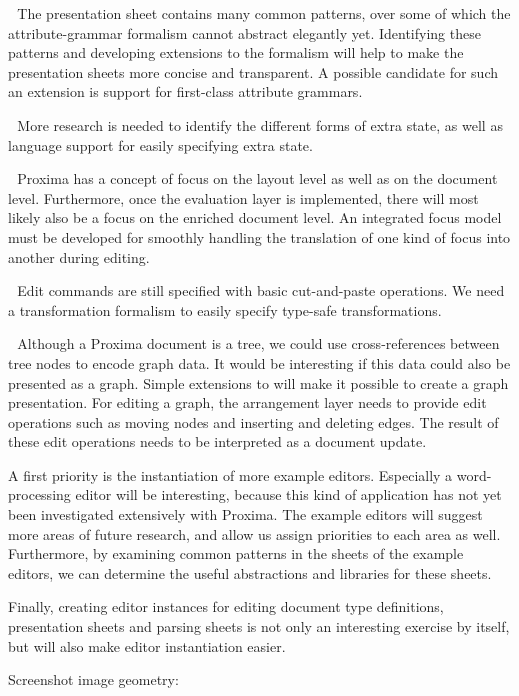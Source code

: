 ~\,The presentation sheet contains many common patterns, over some of which the attribute-grammar formalism cannot abstract elegantly yet. Identifying these patterns and developing extensions to the formalism will help  to make the presentation sheets more concise and transparent. A possible candidate for such an extension is support for first-class attribute grammars.

~\,More research is needed to identify the different forms of extra state, as well as language support for easily specifying extra state.

~\,Proxima has a concept of focus on the layout level as well as on the document level. Furthermore, once the evaluation layer is implemented, there will most likely also be a focus on the enriched document level. An integrated focus model must be developed for smoothly handling the translation of one kind of focus into another during editing.

~\,Edit commands are still specified with basic cut-and-paste operations. We need a transformation formalism to easily specify type-safe transformations.

~\,Although a Proxima document is a tree, we could use cross-references between tree nodes to encode graph data. It would be interesting if this data could also be presented as a graph. Simple extensions to {\Xprez} will make it possible to create a graph presentation. For editing a graph, the arrangement layer needs to provide edit operations such as moving nodes and inserting and deleting edges. The result of these edit operations needs to be interpreted as a document update.

\bigskip
A first priority is the instantiation of more example editors. Especially a word-processing editor will be interesting, because this kind of application has not yet been investigated extensively with Proxima. The example editors will suggest more areas of future research, and allow us assign priorities to each area as well. Furthermore, by examining common patterns in the sheets of the example editors, we can determine the useful abstractions and libraries for these sheets.

Finally, creating editor instances for editing document type definitions, presentation sheets and parsing sheets is not only an interesting exercise by itself, but will also make editor instantiation easier.



\bc

Screenshot image geometry:



\ec